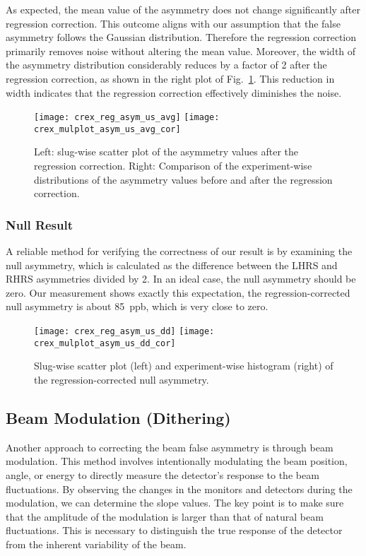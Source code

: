 As expected, the mean value of the asymmetry does not change significantly after
regression correction. This outcome aligns with our assumption that the false 
asymmetry follows the Gaussian distribution. Therefore the regression correction
primarily removes noise without altering the mean value.
Moreover, the width of the asymmetry distribution considerably reduces by a 
factor of 2 after the regression correction, as shown in the right plot of Fig.~\ref{fig:reg_asym_us_avg}. This reduction in width indicates that the regression correction effectively diminishes the noise.

\begin{figure}[!h]
    \centering
    \texttt{[image: crex\_reg\_asym\_us\_avg]}
    \texttt{[image: crex\_mulplot\_asym\_us\_avg\_cor]}
    \caption[Regression correction asymmetry]
    {Left: slug-wise scatter plot of the asymmetry values after the regression correction.
    Right: Comparison of the experiment-wise distributions of the asymmetry values
    before and after the regression correction.}
    \label{fig:reg_asym_us_avg}
\end{figure}

\subsubsection{Null Result}
A reliable method for verifying the correctness of our result is by examining the 
null asymmetry, which is calculated as the difference between the LHRS and RHRS 
asymmetries divided by 2. 
In an ideal case, the null asymmetry should be zero. Our measurement shows exactly
this expectation, the regression-corrected null asymmetry is about 85~ppb, which
is very close to zero.
\begin{figure}[!h]
    \centering
    \texttt{[image: crex\_reg\_asym\_us\_dd]}
    \texttt{[image: crex\_mulplot\_asym\_us\_dd\_cor]}
    \caption{Slug-wise scatter plot (left) and experiment-wise histogram (right) of the
    regression-corrected null asymmetry.}
    \label{fig:reg_asym_us_dd}
\end{figure}

\subsection{Beam Modulation (Dithering)}
Another approach to correcting the beam false asymmetry is through beam modulation. 
This method involves intentionally modulating the beam position, angle, or energy to directly measure the detector's response to the beam fluctuations. By observing the changes in the monitors and detectors during the modulation, we can determine the slope values.
The key point is to make sure that the amplitude of the modulation is larger 
than that of natural beam fluctuations. This is necessary to distinguish the true response of the detector from the inherent variability of the beam.

